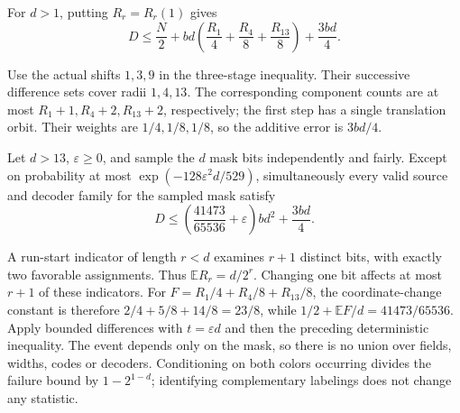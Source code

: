 \begin{proposition}\label{prop:run-spectrum-three}
For $d>1$, putting $R_r=R_r(1)$ gives
\[
 D\le \frac N2+bd\left(\frac{R_1}{4}+\frac{R_4}{8}
                                  +\frac{R_{13}}8\right)+\frac{3bd}4.
\]
\end{proposition}

\begin{outline}
Use the actual shifts $1,3,9$ in the three-stage inequality. Their
successive difference sets cover radii $1,4,13$. The corresponding
component counts are at most $R_1+1,R_4+2,R_{13}+2$, respectively;
the first step has a single translation orbit. Their weights are
$1/4,1/8,1/8$, so the additive error is $3bd/4$.
\end{outline}

\begin{theorem}\label{thm:random-mask-spectrum}
Let $d>13$, $\varepsilon\ge0$, and sample the $d$ mask bits independently
and fairly. Except on probability at most
$\exp(-128\varepsilon^2d/529)$, simultaneously every valid source and
decoder family for the sampled mask satisfy
\[
 D\le\left(\frac{41473}{65536}+\varepsilon\right)bd^2+\frac{3bd}4.
\]
\end{theorem}

\begin{outline}
A run-start indicator of length $r<d$ examines $r+1$ distinct bits, with
exactly two favorable assignments. Thus $\mathbb E R_r=d/2^r$.
Changing one bit affects at most $r+1$ of these indicators. For
$F=R_1/4+R_4/8+R_{13}/8$, the coordinate-change constant is therefore
$2/4+5/8+14/8=23/8$, while
$1/2+\mathbb EF/d=41473/65536$. Apply bounded differences with
$t=\varepsilon d$ and then the preceding deterministic inequality.
The event depends only on the mask, so there is no union over fields,
widths, codes or decoders. Conditioning on both colors occurring divides
the failure bound by $1-2^{1-d}$; identifying complementary labelings
does not change any statistic.
\end{outline}


